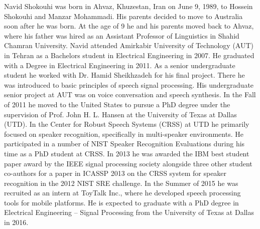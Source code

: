 \documentclass[doublespacing]{utdthesis}
\begin{document}
\mainmatter

















\begin{thesisbib}

\end{thesisbib}  %

\begin{vita}
Navid Shokouhi was born in Ahvaz, Khuzestan, Iran on June 9, 1989, to Hossein Shokouhi and Manzar Mohammadi. 
His parents decided to move to Australia soon after he was born.
At the age of 9 he and his parents moved back to Ahvaz, where his father was hired as an Assistant Professor of Linguistics in Shahid Chamran University. 
Navid attended Amirkabir University of Technology (AUT) in Tehran as a Bachelors student in Electrical Engineering in 2007. 
He graduated with a Degree in Electrical Engineering in 2011. 
As a senior undergraduate student he worked with Dr. Hamid Sheikhzadeh for his final project. 
There he was introduced to basic principles of speech signal processing. 
His undergraduate senior project at AUT was on voice conversation and speech synthesis. 
In the Fall of 2011 he moved to the United States to pursue a PhD degree under the supervision of Prof. John H. L. Hansen at the University of Texas at Dallas (UTD). 
In the Center for Robust Speech Systems (CRSS) at UTD he primarily focused on speaker recognition, specifically in multi-speaker environments. 
He participated in a number of NIST Speaker Recognition Evaluations during his time as a PhD student at CRSS. 
In 2013 he was awarded the IBM best student paper award by the IEEE signal processing society alongside three other student co-authors for a paper in ICASSP 2013 on the CRSS system for speaker recognition in the 2012 NIST SRE challenge. 
In the Summer of 2015 he was recruited as an intern at ToyTalk Inc., where he developed speech processing tools for mobile platforms. 
He is expected to graduate with a PhD degree in Electrical Engineering -- Signal Processing from the University of Texas at Dallas in 2016. 
\end{vita}
\end{document}
